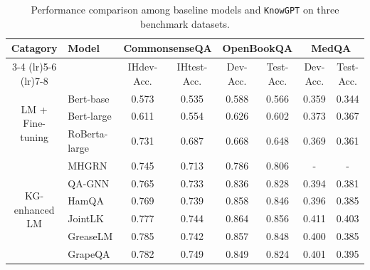 \documentclass{article}
\theoremstyle{boldremark}
\begin{document}
\begin{table}[thp]\small
	\centering
 \vspace{-2mm}
	\caption{Performance comparison among baseline models and \texttt{KnowGPT} on three benchmark datasets.}
	\label{tab:main_results}
	\setlength{\tabcolsep}{0.6mm}
	\begin{tabular}{clcccccc} 
	\toprule
 \multirow{2}{*}{\textbf{Catagory}} & \multirow{2}{*}{\textbf{Model}}  
	
    &\multicolumn{2}{c}{\textbf{CommonsenseQA}}
	& \multicolumn{2}{c}{\textbf{OpenBookQA}} 
	&\multicolumn{2}{c}{\textbf{MedQA}}\\
	\cmidrule(lr){3-4} \cmidrule(lr){5-6} \cmidrule(lr){7-8}
	& &IHdev-Acc. &IHtest-Acc. &Dev-Acc. &Test-Acc. &Dev-Acc. &Test-Acc.\\ \midrule[0.6pt]
        \multirow{3}{*}{LM + Fine-tuning}
        &Bert-base &0.573 &0.535 &0.588 &0.566 &0.359 &0.344 \\
        &Bert-large &0.611 &0.554 &0.626 &0.602 &0.373 &0.367 \\
        &RoBerta-large &0.731 &0.687 &0.668 &0.648 &0.369 &0.361 \\ \midrule
        \multirow{6}{*}{KG-enhanced LM}
        &MHGRN &0.745 &0.713 &0.786 &0.806 &- &- \\
        &QA-GNN &0.765 &0.733 &0.836 &0.828 &0.394 &0.381 \\
        &HamQA &0.769 &0.739 &0.858 &0.846 &0.396 &0.385 \\
        &JointLK &0.777 &0.744 &0.864 &0.856 &0.411 &0.403 \\
        &GreaseLM &0.785 &0.742 &0.857 &0.848 &0.400 &0.385 \\ 
        &GrapeQA &0.782 &0.749 &0.849 &0.824 &0.401 &0.395 \\ 
        \midrule
       
        

\end{tabular}
\end{table}
\end{document}
